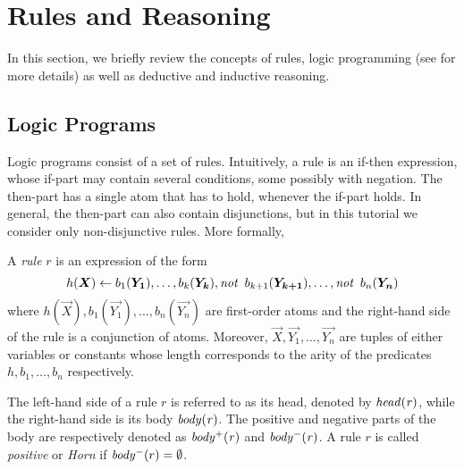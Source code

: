 \section{Rules and Reasoning}
\label{sec:reasoning}
In this section, we briefly review the concepts of rules, logic programming (see \cite{DBLP:conf/rweb/EiterIK09} for more details) as well as %
deductive and inductive reasoning.

\subsection{Logic Programs} Logic programs consist of a set of rules. Intuitively, a rule is an if-then expression, whose if-part may contain several conditions, some possibly with
negation. The then-part has a single atom that has to hold, whenever the if-part holds. In general, the %
then-part %
 can also contain disjunctions, but in this tutorial we consider only non-disjunctive rules. More formally,


\begin{definition}[Rule]\label{def:rule} A \emph{rule} $r$ is an expression of the form
\begin{equation}
h(\vec{X})\leftarrow b_1(\vec{Y_1}),\dotsc,b_k(\vec{Y_k}), \naf\, b_{k+1}(\vec{Y_{k+1}}), \dotsc, \naf\, b_n(\vec{Y_n}) 
\end{equation}
%
where 
$h(\vec{X}), b_1(\vec{Y_1}),\dotsc, b_n(\vec{Y_n})$ are first-order atoms and the right-hand side of the rule is a conjunction of atoms. %
Moreover,  $\vec{X},\vec{Y_1},\ldots,\vec{Y_{n}}$ are tuples of either variables or constants whose length corresponds to the arity of the predicates $h,b_1,\ldots,b_{n}$ respectively.
\end{definition}


The left-hand side of a rule $r$ is referred to as its head, denoted by $\mathit{head(r)}$, while the right-hand side is its body $\mathit{body(r)}$. The positive and negative parts of the body are respectively denoted as $\mathit{body^+(r)}$ and $\mathit{body^-(r)}$. A rule $r$ is called \emph{positive} or
\emph{Horn} if $\mathit{body^-}(r)=\emptyset$.


